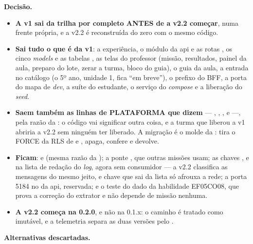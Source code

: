 \textbf{Decisão.}

\begin{itemize}
  \item \textbf{A v1 sai da trilha por completo ANTES de a v2.2 começar}, numa
    frente própria, e a v2.2 é reconstruída do zero com o mesmo código.
  \item \textbf{Sai tudo o que é da v1}: a experiência, o módulo da api e as
    rotas , os cinco \emph{models} e as tabelas
    , as telas do professor (missão, resultados, painel da
    aula, preparo do lote, zerar a turma, bloco do guia), o guia da aula, a
    entrada no catálogo (o 5º ano, unidade 1, fica \enquote{em breve}), o prefixo
    do BFF, a porta do mapa de \emph{dev}, a suíte do estudante, o serviço do
    \emph{compose} e a liberação do \emph{seed}.
  \item \textbf{Saem também as linhas de PLATAFORMA que dizem }
    --- , , ,
     e  ---, pela razão da :
    o código vai significar outra coisa, e a turma que liberou a v1 abriria a
    v2.2 sem ninguém ter liberado. A migração é o molde da :
    tira o FORCE da RLS de  e , apaga, confere e
    devolve.
  \item \textbf{Ficam}:  e 
    (mesma razão da ); a ponte , que
    outras missões usam; as chaves ,  e
     na lista de redação do \emph{log}, agora sem consumidor ---
    a v2.2 classifica as mensagens do mesmo jeito, e chave que sai da lista só
    afrouxa a rede; a porta 5184 no  da api, reservada; e o
    teste do dado da habilidade EF05CO08, que prova a correção do extrator e
    não depende de missão nenhuma.
  \item \textbf{A v2.2 começa na 0.2.0}, e não na 0.1.x: o caminho
     é tratado como imutável, e a
    telemetria separa as duas versões pelo .
\end{itemize}

\textbf{Alternativas descartadas.}


